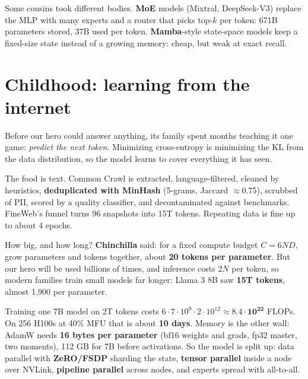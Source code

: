 \documentclass[10pt,a4paper]{extarticle}
\newcommand{\hl}[1]{{\color{acc2}\textbf{#1}}}
\newcommand{\ra}{\,{\color{mute}$\rightarrow$}\,}
\begin{document}
\begin{center}
\end{center}

Some cousins took different bodies. \hl{MoE} models (Mixtral, DeepSeek-V3) replace the MLP with many experts and a router that picks top-$k$ per token: 671B parameters stored, 37B used per token. \hl{Mamba}-style state-space models keep a fixed-size state instead of a growing memory: cheap, but weak at exact recall.

\vspace{2mm}\section{Childhood: learning from the internet}
Before our hero could answer anything, its family spent months teaching it one game: \emph{predict the next token}. Minimizing cross-entropy is minimizing the KL from the data distribution, so the model learns to cover everything it has seen.

The food is text. Common Crawl is extracted, language-filtered, cleaned by heuristics, \hl{deduplicated with MinHash} (5-grams, Jaccard $\approx$0.75), scrubbed of PII, scored by a quality classifier, and decontaminated against benchmarks. FineWeb's funnel turns 96 snapshots into 15T tokens. Repeating data is fine up to about 4 epochs.

How big, and how long? \hl{Chinchilla} said: for a fixed compute budget $C=6ND$, grow parameters and tokens together, about \hl{20 tokens per parameter}. But our hero will be used billions of times, and inference costs $2N$ per token, so modern families train small models far longer: Llama 3 8B saw \hl{15T tokens}, almost 1{,}900 per parameter.

Training one 7B model on 2T tokens costs $6\cdot7{\cdot}10^9\cdot2{\cdot}10^{12}\approx\mathbf{8.4\cdot10^{22}}$ FLOPs. On 256 H100s at 40\% MFU that is about \hl{10 days}. Memory is the other wall: AdamW needs \hl{16 bytes per parameter} (bf16 weights and grads, fp32 master, two moments), 112 GB for 7B before activations. So the model is split up: data parallel with \hl{ZeRO/FSDP} sharding the state, \hl{tensor parallel} inside a node over NVLink, \hl{pipeline parallel} across nodes, and experts spread with all-to-all.
\end{document}
